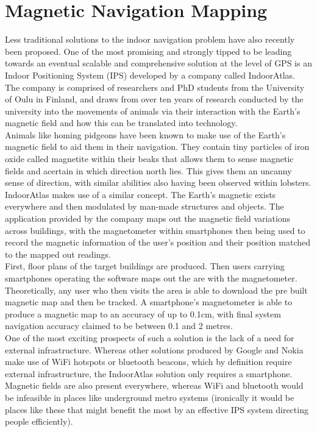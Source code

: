 \documentclass[main.tex]{subfiles}
\begin{document}
 \section{Magnetic Navigation Mapping}
 
 Less traditional solutions to the indoor navigation problem have also recently been proposed. One of the most promising and strongly tipped to be leading towards an eventual scalable and comprehensive solution at the level of GPS is an Indoor Positioning System (IPS) developed by a company called IndoorAtlas. The company is comprised of researchers and PhD students from the University of Oulu in Finland, and draws from over ten years of research conducted by the university into the movements of animals via their interaction with the Earth's magnetic field and how this can be translated into technology.\\
 
 Animals like homing pidgeons have been known to make use of the Earth's magnetic field to aid them in their navigation. They contain tiny particles of iron oxide called magnetite within their beaks that allows them to sense magnetic fields and acertain in which direction north lies. This gives them an uncanny sense of direction, with similar abilities also having been observed within lobsters. \\
 
IndoorAtlas makes use of a similar concept. The Earth's magnetic exists everywhere and then modulated by man-made structures and objects. The application provided by the company maps out the magnetic field variations across buildings, with the magnetometer within smartphones then being used to record the magnetic information of the user's position and their position matched to the mapped out readings.\\
 
 First, floor plans of the target buildings are produced. Then users carrying smartphones operating the software maps out the are with the magnetometer. Theoretically, any user who then visits the area is able to download the pre built magnetic map and then be tracked. A smartphone's magnetometer is able to produce a magnetic map to an accuracy of up to 0.1cm, with final system navigation accuracy claimed to be between 0.1 and 2 metres. \\
 
 One of the most exciting prospects of such a solution is the lack of a need for external infrastructure. Whereas other solutions produced by Google and Nokia make use of WiFi hotspots or bluetooth beacons, which by definition require external infrastructure, the IndoorAtlas solution only requires a smartphone. Magnetic fields are also present everywhere, whereas WiFi and bluetooth would be infeasible in places like underground metro systems (ironically it would be places like these that might benefit the most by an effective IPS system directing people efficiently).\\
 
\end{document}
